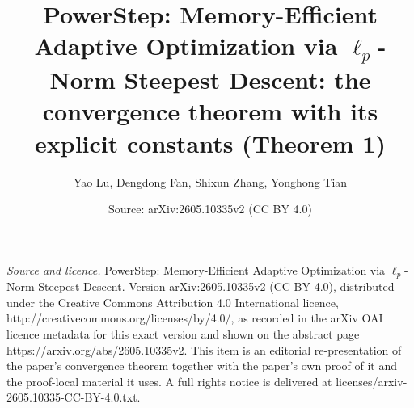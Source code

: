 \documentclass[10pt,a4paper]{amsart}
\title[PowerStep: memory-efficient adaptive optimization]{PowerStep: Memory-Efficient Adaptive Optimization via $\ell_p$-Norm Steepest Descent: the convergence theorem with its explicit constants (Theorem 1)}
\author[Y. Lu, D. Fan, S. Zhang, Y. Tian]{Yao Lu, Dengdong Fan, Shixun Zhang, Yonghong Tian}
\date{Source: arXiv:2605.10335v2 (CC BY 4.0)}
\begin{document}
\maketitle
\vspace{1em}
\noindent\textit{Source and licence.} PowerStep: Memory-Efficient Adaptive Optimization via $\ell_p$-Norm Steepest Descent. Version arXiv:2605.10335v2 (CC BY 4.0), distributed under the Creative Commons Attribution 4.0 International licence, http://creativecommons.org/licenses/by/4.0/, as recorded in the arXiv OAI licence metadata for this exact version and shown on the abstract page https://arxiv.org/abs/2605.10335v2. This item is an editorial re-presentation of the paper's convergence theorem together with the paper's own proof of it and the proof-local material it uses. A full rights notice is delivered at licenses/arxiv-2605.10335-CC-BY-4.0.txt.
\end{document}
